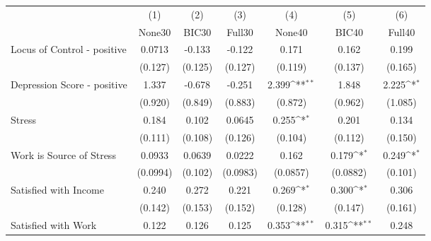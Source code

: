 {
\def\sym#1{\ifmmode^{#1}\else\(^{#1}\)\fi}
\begin{tabular}{l*{6}{c}}
\toprule
            &\multicolumn{1}{c}{(1)}&\multicolumn{1}{c}{(2)}&\multicolumn{1}{c}{(3)}&\multicolumn{1}{c}{(4)}&\multicolumn{1}{c}{(5)}&\multicolumn{1}{c}{(6)}\\
            &\multicolumn{1}{c}{None30}&\multicolumn{1}{c}{BIC30}&\multicolumn{1}{c}{Full30}&\multicolumn{1}{c}{None40}&\multicolumn{1}{c}{BIC40}&\multicolumn{1}{c}{Full40}\\
\midrule
Locus of Control - positive&      0.0713         &      -0.133         &      -0.122         &       0.171         &       0.162         &       0.199         \\
            &     (0.127)         &     (0.125)         &     (0.127)         &     (0.119)         &     (0.137)         &     (0.165)         \\
\addlinespace
Depression Score - positive&       1.337         &      -0.678         &      -0.251         &       2.399\sym{**} &       1.848         &       2.225\sym{*}  \\
            &     (0.920)         &     (0.849)         &     (0.883)         &     (0.872)         &     (0.962)         &     (1.085)         \\
\addlinespace
Stress      &       0.184         &       0.102         &      0.0645         &       0.255\sym{*}  &       0.201         &       0.134         \\
            &     (0.111)         &     (0.108)         &     (0.126)         &     (0.104)         &     (0.112)         &     (0.150)         \\
\addlinespace
Work is Source of Stress&      0.0933         &      0.0639         &      0.0222         &       0.162         &       0.179\sym{*}  &       0.249\sym{*}  \\
            &    (0.0994)         &     (0.102)         &    (0.0983)         &    (0.0857)         &    (0.0882)         &     (0.101)         \\
\addlinespace
Satisfied with Income&       0.240         &       0.272         &       0.221         &       0.269\sym{*}  &       0.300\sym{*}  &       0.306         \\
            &     (0.142)         &     (0.153)         &     (0.152)         &     (0.128)         &     (0.147)         &     (0.161)         \\
\addlinespace
Satisfied with Work&       0.122         &       0.126         &       0.125         &       0.353\sym{**} &       0.315\sym{**} &       0.248         \\

\end{tabular}}
